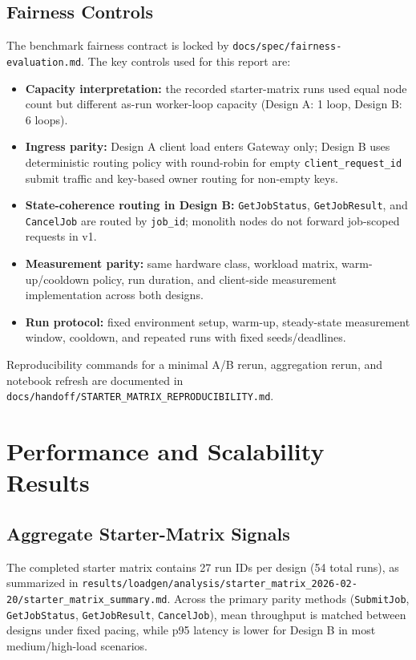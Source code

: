 \documentclass[11pt]{article}
\begin{document}
\subsection{Fairness Controls}
The benchmark fairness contract is locked by \texttt{docs/spec/fairness-evaluation.md}. The key controls used for this report are:
\begin{itemize}
    \item \textbf{Capacity interpretation:} the recorded starter-matrix runs used equal node count but different as-run worker-loop capacity (Design A: 1 loop, Design B: 6 loops).
    \item \textbf{Ingress parity:} Design A client load enters Gateway only; Design B uses deterministic routing policy with round-robin for empty \texttt{client\_request\_id} submit traffic and key-based owner routing for non-empty keys.
    \item \textbf{State-coherence routing in Design B:} \texttt{GetJobStatus}, \texttt{GetJobResult}, and \texttt{CancelJob} are routed by \texttt{job\_id}; monolith nodes do not forward job-scoped requests in v1.
    \item \textbf{Measurement parity:} same hardware class, workload matrix, warm-up/cooldown policy, run duration, and client-side measurement implementation across both designs.
    \item \textbf{Run protocol:} fixed environment setup, warm-up, steady-state measurement window, cooldown, and repeated runs with fixed seeds/deadlines.
\end{itemize}
\noindent
Reproducibility commands for a minimal A/B rerun, aggregation rerun, and notebook refresh are documented in \texttt{docs/handoff/STARTER\_MATRIX\_REPRODUCIBILITY.md}.

\section{Performance and Scalability Results}
\subsection{Aggregate Starter-Matrix Signals}
The completed starter matrix contains 27 run IDs per design (54 total runs), as summarized in \texttt{results/loadgen/analysis/starter\_matrix\_2026-02-20/starter\_matrix\_summary.md}.
Across the primary parity methods (\texttt{SubmitJob}, \texttt{GetJobStatus}, \texttt{GetJobResult}, \texttt{CancelJob}), mean throughput is matched between designs under fixed pacing, while p95 latency is lower for Design B in most medium/high-load scenarios.
\end{document}
